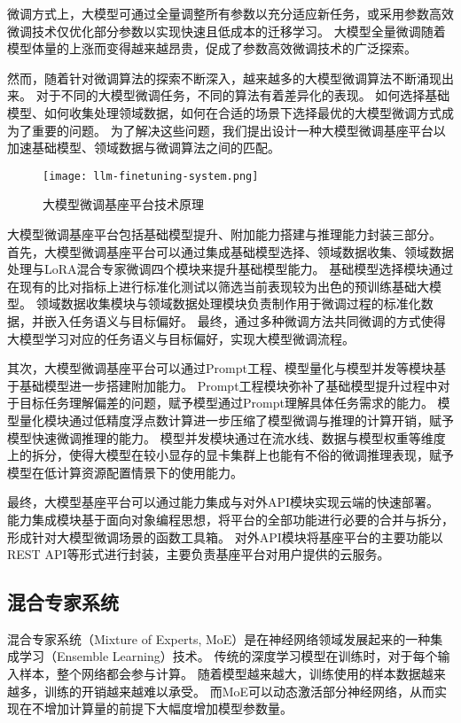 微调方式上，大模型可通过全量调整所有参数以充分适应新任务，或采用参数高效微调技术仅优化部分参数以实现快速且低成本的迁移学习。
大模型全量微调随着模型体量的上涨而变得越来越昂贵，促成了参数高效微调技术的广泛探索。

然而，随着针对微调算法的探索不断深入，越来越多的大模型微调算法不断涌现出来。
对于不同的大模型微调任务，不同的算法有着差异化的表现。
如何选择基础模型、如何收集处理领域数据，如何在合适的场景下选择最优的大模型微调方式成为了重要的问题。
为了解决这些问题，我们提出设计一种大模型微调基座平台以加速基础模型、领域数据与微调算法之间的匹配。

\begin{figure}
  \centering
  \texttt{[image: llm-finetuning-system.png]}
  \caption{大模型微调基座平台技术原理}
  \label{fig:finetuningsys}
\end{figure}

大模型微调基座平台包括基础模型提升、附加能力搭建与推理能力封装三部分。
首先，大模型微调基座平台可以通过集成基础模型选择、领域数据收集、领域数据处理与LoRA混合专家微调四个模块来提升基础模型能力。
基础模型选择模块通过在现有的比对指标上进行标准化测试以筛选当前表现较为出色的预训练基础大模型。
领域数据收集模块与领域数据处理模块负责制作用于微调过程的标准化数据，并嵌入任务语义与目标偏好。
最终，通过多种微调方法共同微调的方式使得大模型学习对应的任务语义与目标偏好，实现大模型微调流程。

其次，大模型微调基座平台可以通过Prompt工程、模型量化与模型并发等模块基于基础模型进一步搭建附加能力。
Prompt工程模块弥补了基础模型提升过程中对于目标任务理解偏差的问题，赋予模型通过Prompt理解具体任务需求的能力。
模型量化模块通过低精度浮点数计算进一步压缩了模型微调与推理的计算开销，赋予模型快速微调推理的能力。
模型并发模块通过在流水线、数据与模型权重等维度上的拆分，使得大模型在较小显存的显卡集群上也能有不俗的微调推理表现，赋予模型在低计算资源配置情景下的使用能力。

最终，大模型基座平台可以通过能力集成与对外API模块实现云端的快速部署。
能力集成模块基于面向对象编程思想，将平台的全部功能进行必要的合并与拆分，形成针对大模型微调场景的函数工具箱。
对外API模块将基座平台的主要功能以REST API等形式进行封装，主要负责基座平台对用户提供的云服务。

\subsection{混合专家系统}

混合专家系统（Mixture of Experts, MoE）是在神经网络领域发展起来的一种集成学习（Ensemble Learning）技术。
传统的深度学习模型在训练时，对于每个输入样本，整个网络都会参与计算。
随着模型越来越大，训练使用的样本数据越来越多，训练的开销越来越难以承受。
而MoE可以动态激活部分神经网络，从而实现在不增加计算量的前提下大幅度增加模型参数量。

